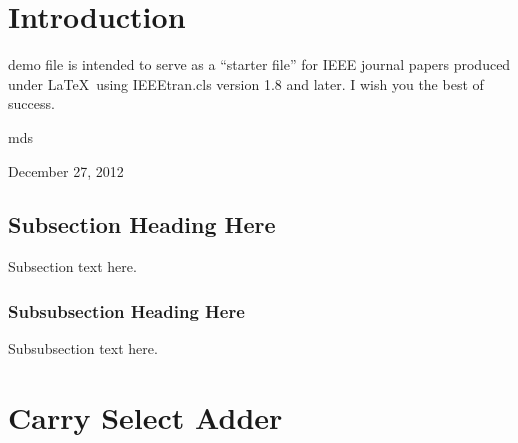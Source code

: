 \documentclass[journal]{IEEEtran}
\begin{document}
\begin{IEEEkeywords}

\end{IEEEkeywords}


%
\IEEEpeerreviewmaketitle



\section{Introduction}
% 
% 
% 
% 
 demo file is intended to serve as a ``starter file''
for IEEE journal papers produced under \LaTeX\ using
IEEEtran.cls version 1.8 and later.
I wish you the best of success.

\hfill mds
 
\hfill December 27, 2012

\subsection{Subsection Heading Here}
Subsection text here.


\subsubsection{Subsubsection Heading Here}
Subsubsection text here.

\section{Carry Select Adder}
\end{document}
